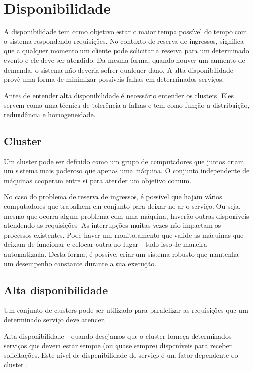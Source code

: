 \chapter{Disponibilidade}

A disponibilidade tem como objetivo estar o maior tempo possível do tempo
com o sistema respondendo requisições. No contexto de reserva de ingressos,
significa que a qualquer momento um cliente pode solicitar a reserva para
um determinado evento e ele deve ser atendido. Da mesma forma, quando houver
um aumento de demanda, o sistema não deveria sofrer qualquer dano. A alta
disponibilidade provê uma forma de minimizar possíveis falhas em determinados
serviços.

Antes de entender alta disponibilidade é necessário entender os clusters.
Eles servem como uma técnica de tolerência a falhas e tem como função a
distribuição, redundância e homogeneidade.

\section{Cluster}

Um cluster pode ser definido como um grupo de computadores que juntos
criam um sistema mais poderoso que apenas uma máquina. O conjunto
independente de máquinas cooperam entre si para atender um objetivo comum.

No caso do problema de reserva de ingressos, é possível que hajam vários
computadores que trabalhem em conjunto para deixar no ar o serviço.
Ou seja, mesmo que ocorra algum problema com uma máquina, haverão outras
disponíveis atendendo as requisições.
As interrupções muitas vezes não impactam os processos existentes.
Pode haver um monitoramento que valide as máquinas que deixam de funcionar
e colocar outra no lugar - tudo isso de maneira automatizada.
Desta forma, é possível criar um sistema robusto que mantenha um desempenho
constante durante a sua execução.

\section{Alta disponibilidade}

Um conjunto de clusters pode ser utilizado para paralelizar as requisições
que um determinado serviço deve atender.

\begin{citacao}

Alta disponibilidade - quando desejamos que o cluster forneça determinados
serviços que devem estar sempre (ou quase sempre) disponíveis para receber
solicitações.
Este nível de disponibilidade do serviço é um fator dependente do cluster
\cite{servicos-de-pertinencia-para-clusters-de-alta-disponibilidade}.

\end{citacao}

